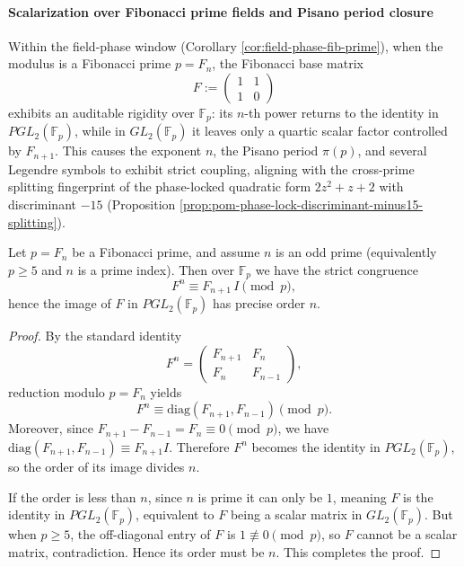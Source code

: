 
\paragraph{Scalarization over Fibonacci prime fields and Pisano period closure}\label{par:gut-fibprime-pgl2-pisano}
Within the field-phase window (Corollary \ref{cor:field-phase-fib-prime}), when the modulus is a Fibonacci prime \(p=F_n\),
the Fibonacci base matrix
\[
F:=\begin{pmatrix}1&1\\[2pt]1&0\end{pmatrix}
\]
exhibits an auditable rigidity over \(\mathbb{F}_p\): its \(n\)-th power returns to the identity in \(PGL_2(\mathbb{F}_p)\),
while in \(GL_2(\mathbb{F}_p)\) it leaves only a quartic scalar factor controlled by \(F_{n+1}\).
This causes the exponent \(n\), the Pisano period \(\pi(p)\), and several Legendre symbols to exhibit strict coupling, aligning with the cross-prime splitting fingerprint of the phase-locked quadratic form
\(2z^2+z+2\) with discriminant \(-15\) (Proposition \ref{prop:pom-phase-lock-discriminant-minus15-splitting}).

\begin{proposition}\label{prop:gut-fibprime-pgl2-order-n}
Let \(p=F_n\) be a Fibonacci prime, and assume \(n\) is an odd prime (equivalently \(p\ge 5\) and \(n\) is a prime index).
Then over \(\mathbb{F}_p\) we have the strict congruence
\[
F^n\equiv F_{n+1}\,I\pmod p,
\]
hence the image of \(F\) in \(PGL_2(\mathbb{F}_p)\) has precise order \(n\).
\end{proposition}
\begin{proof}
By the standard identity
\[
F^n=
\begin{pmatrix}
F_{n+1} & F_n\\
F_n & F_{n-1}
\end{pmatrix},
\]
reduction modulo \(p=F_n\) yields
\[
F^n\equiv
\mathrm{diag}(F_{n+1},F_{n-1})
\pmod p.
\]
Moreover, since \(F_{n+1}-F_{n-1}=F_n\equiv 0\pmod p\), we have \(\mathrm{diag}(F_{n+1},F_{n-1})\equiv F_{n+1}I\).
Therefore \(F^n\) becomes the identity in \(PGL_2(\mathbb{F}_p)\), so the order of its image divides \(n\).
\par
If the order is less than \(n\), since \(n\) is prime it can only be \(1\), meaning \(F\) is the identity in \(PGL_2(\mathbb{F}_p)\), equivalent to \(F\) being a scalar matrix in \(GL_2(\mathbb{F}_p)\).
But when \(p\ge 5\), the off-diagonal entry of \(F\) is \(1\not\equiv 0\pmod p\), so \(F\) cannot be a scalar matrix, contradiction.
Hence its order must be \(n\). This completes the proof.
\end{proof}

